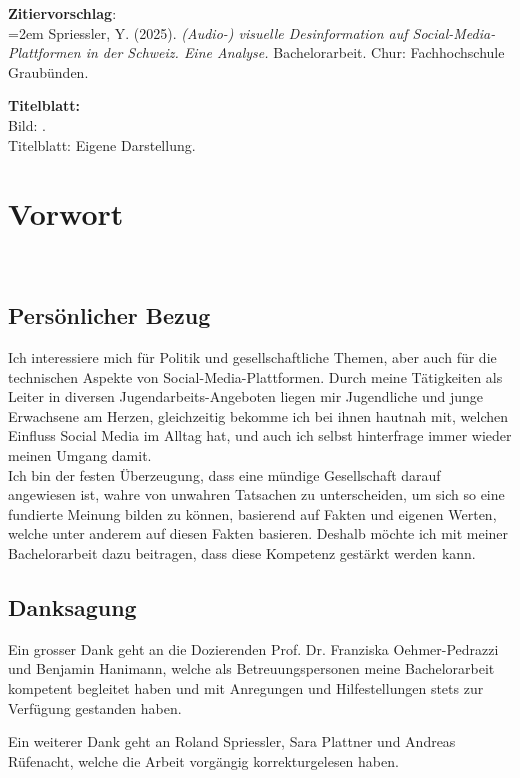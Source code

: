 \documentclass[12pt,a4paper]{article}        %
\begin{document}
\textbf{Zitiervorschlag}:\\
\hangindent=2em
Spriessler, Y. (2025). \textit{(Audio-) visuelle Desinformation auf Social-Media-Plattformen in der Schweiz. Eine Analyse.} Bachelorarbeit. Chur: Fachhochschule Graubünden.

\textbf{Titelblatt:}\\
Bild: .\\
Titelblatt: Eigene Darstellung.
\pagebreak

\clearpage       %
\section*{Vorwort}
~\label{foreword}
\subsection*{Persönlicher Bezug}
Ich interessiere mich für Politik und gesellschaftliche Themen, aber auch für die technischen Aspekte von Social-Media-Plattformen. Durch meine Tätigkeiten als Leiter in diversen Jugendarbeits-Angeboten liegen mir Jugendliche und junge Erwachsene am Herzen, gleichzeitig bekomme ich bei ihnen hautnah mit, welchen Einfluss Social Media im Alltag hat, und auch ich selbst hinterfrage immer wieder meinen Umgang damit.\\
Ich bin der festen Überzeugung, dass eine mündige Gesellschaft darauf angewiesen ist, wahre von unwahren Tatsachen zu unterscheiden, um sich so eine fundierte Meinung bilden zu können, basierend auf Fakten und eigenen Werten, welche unter anderem auf diesen Fakten basieren. Deshalb möchte ich mit meiner Bachelorarbeit dazu beitragen, dass diese Kompetenz gestärkt werden kann.

\subsection*{Danksagung}
Ein grosser Dank geht an die Dozierenden Prof. Dr. Franziska Oehmer-Pedrazzi und Benjamin Hanimann, welche als Betreuungspersonen meine Bachelorarbeit kompetent begleitet haben und mit Anregungen und Hilfestellungen stets zur Verfügung gestanden haben.

Ein weiterer Dank geht an Roland Spriessler, Sara Plattner und Andreas Rüfenacht, welche die Arbeit vorgängig korrekturgelesen haben.
\end{document}
